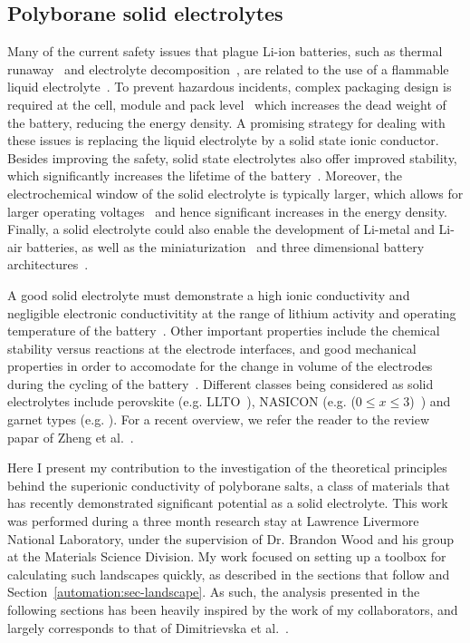 \begin{refsection}
\section{Polyborane solid electrolytes} \label{batteries:sec-solid_electrolyte}

Many of the current safety issues that plague Li-ion batteries, such as thermal runaway~\cite{Wang2012} and electrolyte decomposition~\cite{Lisbona2011}, are related to the use of a flammable liquid electrolyte~\cite{Liu2018, Ouyang2019}. To prevent hazardous incidents, complex packaging design is required at the cell, module and pack level~\cite{Dougthy2012} which increases the dead weight of the battery, reducing the energy density. A promising strategy for dealing with these issues is replacing the liquid electrolyte by a solid state ionic conductor. Besides improving the safety, solid state electrolytes also offer improved stability, which significantly increases the lifetime of the battery~\cite{Mauger2019}. Moreover, the electrochemical window of the solid electrolyte is typically larger, which allows for larger operating voltages~\cite{Li2014} and hence significant increases in the energy density. Finally, a solid electrolyte could also enable the development of Li-metal and Li-air batteries, as well as the miniaturization~\cite{Bates2000, Um2017} and three dimensional battery architectures~\cite{Long2004, Pearse2018}. 

A good solid electrolyte must demonstrate a high ionic conductivity and negligible electronic conductivitity at the range of lithium activity and operating temperature of the battery~\cite{Knauth2009}. Other important properties include the chemical stability versus reactions at the electrode interfaces, and good mechanical properties in order to accomodate for the change in volume of the electrodes during the cycling of the battery~\cite{Koerver2018}. Different classes being considered as solid electrolytes include perovskite (e.g. LLTO~\cite{Inaguma1993}), NASICON (e.g.  ($0 \leq x \leq 3$)~\cite{Hagman1968}) and garnet types (e.g.  \cite{Murugan2007}). For a recent overview, we refer the reader to the review papar of Zheng et al.~\cite{Zheng2018}.

Here I present my contribution to the investigation of the theoretical principles behind the superionic conductivity of polyborane salts, a class of materials that has recently demonstrated significant potential as a solid electrolyte. This work was performed during a three month research stay at Lawrence Livermore National Laboratory, under the supervision of Dr. Brandon Wood and his group at the Materials Science Division. My work focused on setting up a toolbox for calculating such landscapes quickly, as described in the sections that follow and Section~\ref{automation:sec-landscape}. As such, the analysis presented in the following sections has been heavily inspired by the work of my collaborators, and largely corresponds to that of Dimitrievska et al.~\cite{Dimitrievska2018}. 


\end{refsection}
